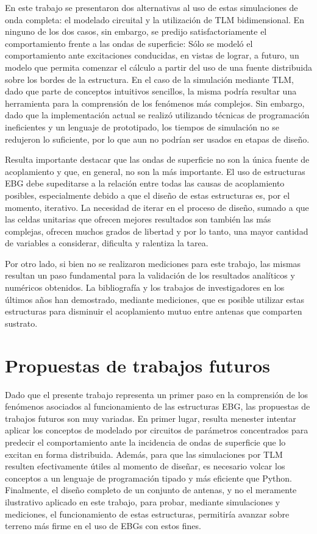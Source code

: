 En este trabajo se presentaron dos alternativas al uso de estas simulaciones de onda completa: el modelado circuital y la utilización de TLM bidimensional. En ninguno de los dos casos, sin embargo, se predijo satisfactoriamente el comportamiento frente a las ondas de superficie: Sólo se modeló el comportamiento ante excitaciones conducidas, en vistas de lograr, a futuro, un modelo que permita comenzar el cálculo a partir del uso de una fuente distribuida sobre los bordes de la estructura. En el caso de la simulación mediante TLM, dado que parte de conceptos intuitivos sencillos, la misma podría resultar una herramienta para la comprensión de los fenómenos más complejos. Sin embargo, dado que la implementación actual se realizó utilizando técnicas de programación ineficientes y un lenguaje de prototipado, los tiempos de simulación no se redujeron lo suficiente, por lo que aun no podrían ser usados en etapas de diseño.

Resulta importante destacar que las ondas de superficie no son la única fuente de acoplamiento y que, en general, no son la más importante. El uso de estructuras EBG debe supeditarse a la relación entre todas las causas de acoplamiento posibles, especialmente debido a que el diseño de estas estructuras es, por el momento, iterativo. La necesidad de iterar en el proceso de diseño, sumado a que las celdas unitarias que ofrecen mejores resultados son también las más complejas, ofrecen muchos grados de libertad y por lo tanto, una mayor cantidad de variables a considerar, dificulta y ralentiza la tarea.

Por otro lado, si bien no se realizaron mediciones para este trabajo, las mismas resultan un paso fundamental para la validación de los resultados analíticos y numéricos obtenidos. La bibliografía y los trabajos de investigadores en los últimos años han demostrado, mediante mediciones, que es posible utilizar estas estructuras para disminuir el acoplamiento mutuo entre antenas que comparten sustrato.

\section{Propuestas de trabajos futuros}

Dado que el presente trabajo representa un primer paso en la comprensión de los fenómenos asociados al funcionamiento de las estructuras EBG, las propuestas de trabajos futuros son muy variadas. En primer lugar, resulta menester intentar aplicar los conceptos de modelado por circuitos de parámetros concentrados para predecir el comportamiento ante la incidencia de ondas de superficie que lo excitan en forma distribuida. Además, para que las simulaciones por TLM resulten efectivamente útiles al momento de diseñar, es necesario volcar los conceptos a un lenguaje de programación tipado y más eficiente que Python. Finalmente, el diseño completo de un conjunto de antenas, y no el meramente ilustrativo aplicado en este trabajo, para probar, mediante simulaciones y mediciones, el funcionamiento de estas estructuras, permitiría avanzar sobre terreno más firme en el uso de EBGs con estos fines.

